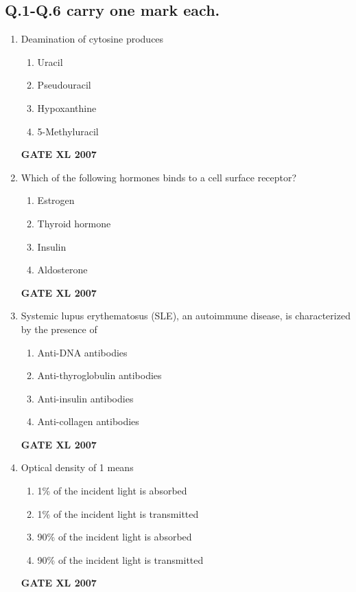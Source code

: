 \documentclass[journal,12pt,onecolumn]{IEEEtran}
\begin{document}
\subsection*{Q.1-Q.6 carry one mark each.}

\begin{enumerate}
    \item Deamination of cytosine produces 
    \begin{multicols}{2}
        \begin{enumerate} 
            \item Uracil
            \item Pseudouracil
            \item Hypoxanthine
            \item 5-Methyluracil
        \end{enumerate}
    \end{multicols}
	    \hfill \textbf{GATE XL 2007}

    \item Which of the following hormones binds to a cell surface receptor? 
    \begin{multicols}{2}
        \begin{enumerate} 
            \item Estrogen
            \item Thyroid hormone
            \item Insulin
            \item Aldosterone
        \end{enumerate}
    \end{multicols}
	    \hfill \textbf{GATE XL 2007}

    \item Systemic lupus erythematosus (SLE), an autoimmune disease, is characterized by the presence of 
    \begin{multicols}{2}
        \begin{enumerate} 
            \item Anti-DNA antibodies
            \item Anti-thyroglobulin antibodies
            \item Anti-insulin antibodies
            \item Anti-collagen antibodies
        \end{enumerate}
    \end{multicols}
	    \hfill \textbf{GATE XL 2007}

    \item Optical density of 1 means 
        \begin{enumerate} 
            \item 1\% of the incident light is absorbed
            \item 1\% of the incident light is transmitted
            \item 90\% of the incident light is absorbed
            \item 90\% of the incident light is transmitted
        \end{enumerate}
	    \hfill \textbf{GATE XL 2007}


\end{enumerate}
\end{document}
